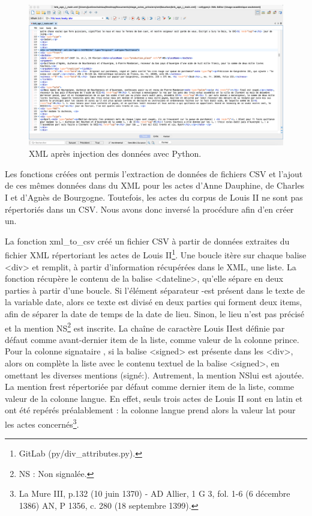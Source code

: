 \begin{figure}[ht]
    \centering
    \includegraphics[scale=0.29]{img/injection.png}
    \caption{XML après injection des données avec Python.}
    \label{fig:injection}
\end{figure}

\par Les fonctions créées ont permis l'extraction de données de fichiers CSV et l'ajout de ces mêmes données dans du XML pour les actes d'Anne Dauphine, de Charles I et d'Agnès de Bourgogne. Toutefois, les actes du corpus de Louis II ne sont pas répertoriés dans un CSV. Nous avons donc inversé la procédure afin d'en créer un.
\newline 

\par La fonction xml\_to\_csv créé un fichier CSV à partir de données extraites du fichier XML répertoriant les actes de Louis II\footnote{GitLab (py/div\_attributes.py).}. Une boucle itère sur chaque balise <div> et remplit, à partir d'information récupérées dans le XML, une liste. La fonction récupère le contenu de la balise <dateline>, qu'elle sépare en deux parties à partir d'une boucle. Si l'élément séparateur \og -\fg \space est présent dans le texte de la variable date, alors ce texte est divisé en deux parties qui forment deux items, afin de séparer la date de temps de la date de lieu. Sinon, le lieu n'est pas précisé et la mention \og NS\fg\footnote{NS : Non signalée.} \space est inscrite. La chaîne de caractère \og Louis II\fg \space est définie par défaut comme avant-dernier item de la liste, comme valeur de la colonne \og prince\fg. Pour la colonne \og signataire \fg, si la balise <signed> est présente dans les <div>, alors on complète la liste avec le contenu textuel de la balise <signed>, en omettant les diverses mentions \og (signé:)\fg. Autrement, la mention \og NS\fg \space lui est ajoutée. La mention \og fr\fg \space est répertoriée par défaut comme dernier item de la liste, comme valeur de la colonne \og langue\fg. En effet, seuls trois actes de Louis II sont en latin et ont été repérés préalablement : la colonne langue prend alors la valeur \og lat \fg \space pour les actes concernés\footnote{La Mure III, p.132 (10 juin 1370) - AD Allier, 1 G 3, fol. 1-6 (6 décembre 1386) \newline AN, P 1356, c. 280 (18 septembre 1399).}. 
\newpage 

